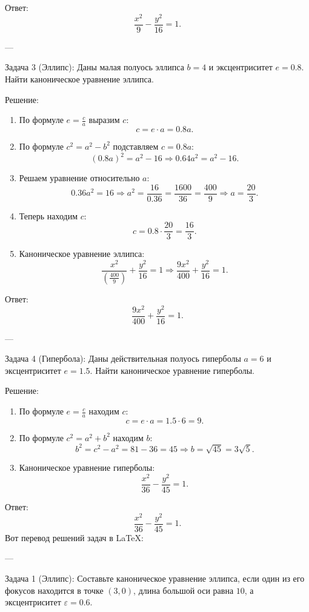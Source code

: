 \documentclass[a4paper,14pt]{extreport} %
\begin{document}
 Ответ: 
\[
\boxed{\frac{x^2}{9} - \frac{y^2}{16} = 1}.
\]

---

     Задача 3 (Эллипс):
Даны малая полуось эллипса \(b = 4\) и эксцентриситет \(e = 0.8\). Найти каноническое уравнение эллипса.

 Решение: 
\begin{enumerate}
    \item По формуле \(e = \frac{c}{a}\) выразим \(c\):
    \[
    c = e \cdot a = 0.8a.
    \]
    \item По формуле \(c^2 = a^2 - b^2\) подставляем \(c = 0.8a\):
    \[
    (0.8a)^2 = a^2 - 16 \Rightarrow 0.64a^2 = a^2 - 16.
    \]
    \item Решаем уравнение относительно \(a\):
    \[
    0.36a^2 = 16 \Rightarrow a^2 = \frac{16}{0.36} = \frac{1600}{36} = \frac{400}{9} \Rightarrow a = \frac{20}{3}.
    \]
    \item Теперь находим \(c\):
    \[
    c = 0.8 \cdot \frac{20}{3} = \frac{16}{3}.
    \]
    \item Каноническое уравнение эллипса:
    \[
    \frac{x^2}{\left(\frac{400}{9}\right)} + \frac{y^2}{16} = 1 \Rightarrow \frac{9x^2}{400} + \frac{y^2}{16} = 1.
    \]
\end{enumerate}

 Ответ: 
\[
\boxed{\frac{9x^2}{400} + \frac{y^2}{16} = 1}.
\]

---

     Задача 4 (Гипербола):
Даны действительная полуось гиперболы \(a = 6\) и эксцентриситет \(e = 1.5\). Найти каноническое уравнение гиперболы.

 Решение: 
\begin{enumerate}
    \item По формуле \(e = \frac{c}{a}\) находим \(c\):
    \[
    c = e \cdot a = 1.5 \cdot 6 = 9.
    \]
    \item По формуле \(c^2 = a^2 + b^2\) находим \(b\):
    \[
    b^2 = c^2 - a^2 = 81 - 36 = 45 \Rightarrow b = \sqrt{45} = 3\sqrt{5}.
    \]
    \item Каноническое уравнение гиперболы:
    \[
    \frac{x^2}{36} - \frac{y^2}{45} = 1.
    \]
\end{enumerate}

 Ответ: 
\[
\boxed{\frac{x^2}{36} - \frac{y^2}{45} = 1}.
\]
Вот перевод решений задач в LaTeX:

---

 Задача 1 (Эллипс):   
Составьте каноническое уравнение эллипса, если один из его фокусов находится в точке \((3, 0)\), длина большой оси равна \(10\), а эксцентриситет \(\varepsilon = 0.6\).
\end{document}
